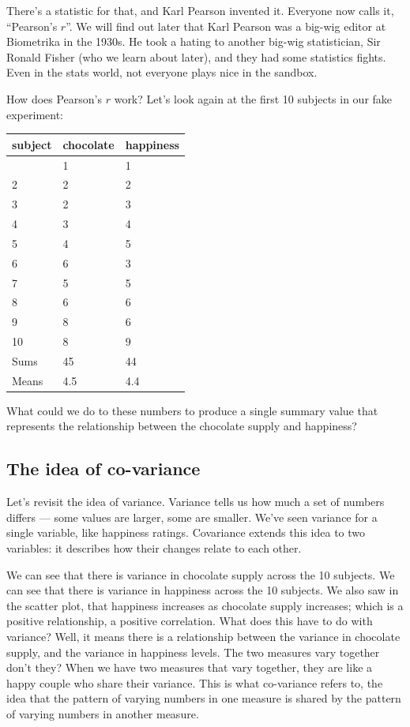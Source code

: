 \documentclass[
  letterpaper,
  DIV=11,
  numbers=noendperiod]{scrreprt}
\begin{document}
There's a statistic for that, and Karl Pearson invented it. Everyone now
calls it, ``Pearson's \(r\)''. We will find out later that Karl Pearson
was a big-wig editor at Biometrika in the 1930s. He took a hating to
another big-wig statistician, Sir Ronald Fisher (who we learn about
later), and they had some statistics fights. Even in the stats world,
not everyone plays nice in the sandbox.

How does Pearson's \(r\) work? Let's look again at the first 10 subjects
in our fake experiment:

\begin{longtable}[]{@{}lll@{}}
\toprule\noalign{}
subject & chocolate & happiness \\
\midrule\noalign{}
\endhead
\bottomrule\noalign{}
\endlastfoot
1 & 1 & 1 \\
2 & 2 & 2 \\
3 & 2 & 3 \\
4 & 3 & 4 \\
5 & 4 & 5 \\
6 & 6 & 3 \\
7 & 5 & 5 \\
8 & 6 & 6 \\
9 & 8 & 6 \\
10 & 8 & 9 \\
Sums & 45 & 44 \\
Means & 4.5 & 4.4 \\
\end{longtable}

What could we do to these numbers to produce a single summary value that
represents the relationship between the chocolate supply and happiness?

\subsection{The idea of co-variance}\label{the-idea-of-co-variance}

Let's revisit the idea of variance. Variance tells us how much a set of
numbers differs --- some values are larger, some are smaller. We've seen
variance for a single variable, like happiness ratings. Covariance
extends this idea to two variables: it describes how their changes
relate to each other.

We can see that there is variance in chocolate supply across the 10
subjects. We can see that there is variance in happiness across the 10
subjects. We also saw in the scatter plot, that happiness increases as
chocolate supply increases; which is a positive relationship, a positive
correlation. What does this have to do with variance? Well, it means
there is a relationship between the variance in chocolate supply, and
the variance in happiness levels. The two measures vary together don't
they? When we have two measures that vary together, they are like a
happy couple who share their variance. This is what co-variance refers
to, the idea that the pattern of varying numbers in one measure is
shared by the pattern of varying numbers in another measure.
\end{document}
